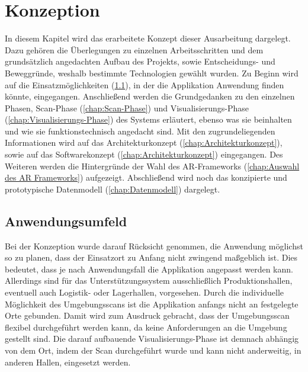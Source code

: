 
\chapter{Konzeption}
\label{chap:Konzeption}
In diesem Kapitel wird das erarbeitete Konzept dieser Ausarbeitung dargelegt. Dazu gehören die Überlegungen zu einzelnen 
Arbeitsschritten und dem grundsätzlich angedachten Aufbau des Projekts, sowie Entscheidungs- und Beweggründe, weshalb bestimmte 
Technologien gewählt wurden. Zu Beginn wird auf die Einsatzmöglichkeiten (\ref{chap:Arbeitsumgebung}), in der die Applikation Anwendung 
finden könnte, eingegangen. Anschließend werden die Grundgedanken zu den einzelnen Phasen, Scan-Phase (\ref{chap:Scan-Phase}) und 
Visualisierungs-Phase (\ref{chap:Visualisierungs-Phase}) des Systems erläutert, ebenso was sie beinhalten und wie sie funktionstechnisch 
angedacht sind. Mit den zugrundeliegenden Informationen wird auf das Architekturkonzept (\ref{chap:Architekturkonzept}), sowie auf das 
Softwarekonzept (\ref{chap:Architekturkonzept}) eingegangen. Des Weiteren werden die Hintergründe der Wahl des AR-Frameworks 
(\ref{chap:Auswahl des AR Frameworks}) aufgezeigt. Abschließend wird noch das konzipierte und prototypische Datenmodell 
(\ref{chap:Datenmodell}) dargelegt.

\section{Anwendungsumfeld}
\label{chap:Arbeitsumgebung}
Bei der Konzeption wurde darauf Rücksicht genommen, die Anwendung möglichst so zu planen, dass der Einsatzort zu Anfang nicht zwingend 
maßgeblich ist. Dies bedeutet, dass je nach Anwendungsfall die Applikation angepasst werden kann. Allerdings sind für das 
Unterstützungssystem ausschließlich Produktionshallen, eventuell auch Logistik- oder Lagerhallen, vorgesehen. Durch die individuelle 
Möglichkeit des Umgebungsscans ist die Applikation anfangs nicht an festgelegte Orte gebunden. Damit wird zum Ausdruck gebracht, dass der 
Umgebungsscan flexibel durchgeführt werden kann, da keine Anforderungen an die Umgebung gestellt sind. Die darauf aufbauende 
Visualisierungs-Phase ist demnach abhängig von dem Ort, indem der Scan durchgeführt wurde und kann nicht anderweitig, in anderen Hallen, 
eingesetzt werden. 
\pagebreak
